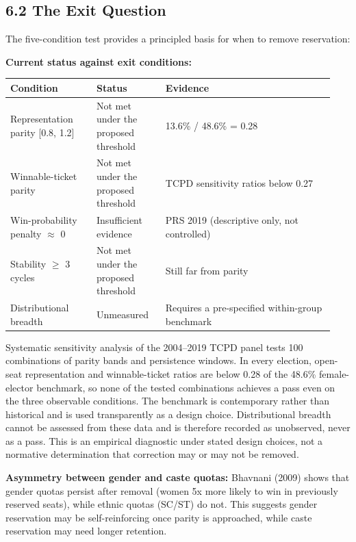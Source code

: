 \documentclass[
]{article}
\newcounter{none} %
\begin{document}
\subsection{6.2 The Exit Question}\label{62-the-exit-question}

The five-condition test provides a principled basis for when to remove reservation:

\textbf{Current status against exit conditions:}

{\def\LTcaptype{none} %
\begin{longtable}[]{@{}p{0.25\linewidth}p{0.20\linewidth}p{0.49\linewidth}@{}}
\toprule\noalign{}
Condition & Status & Evidence \\
\midrule\noalign{}
\endhead
\bottomrule\noalign{}
\endlastfoot
Representation parity {[}0.8, 1.2{]} & Not met under the proposed threshold & 13.6\% / 48.6\% = 0.28 \\
Winnable-ticket parity & Not met under the proposed threshold & TCPD sensitivity ratios below 0.27 \\
Win-probability penalty $\approx$ 0 & Insufficient evidence & PRS 2019 (descriptive only, not controlled) \\
Stability $\geq$ 3 cycles & Not met under the proposed threshold & Still far from parity \\
Distributional breadth & Unmeasured & Requires a pre-specified within-group benchmark \\
\end{longtable}
}

Systematic sensitivity analysis of the 2004--2019 TCPD panel tests 100 combinations of parity bands and persistence windows. In every election, open-seat representation and winnable-ticket ratios are below 0.28 of the 48.6\% female-elector benchmark, so none of the tested combinations achieves a pass even on the three observable conditions. The benchmark is contemporary rather than historical and is used transparently as a design choice. Distributional breadth cannot be assessed from these data and is therefore recorded as unobserved, never as a pass. This is an empirical diagnostic under stated design choices, not a normative determination that correction may or may not be removed.

\textbf{Asymmetry between gender and caste quotas:} Bhavnani (2009) shows that gender quotas persist after removal (women 5x more likely to win in previously reserved seats), while ethnic quotas (SC/ST) do not. This suggests gender reservation may be self-reinforcing once parity is approached, while caste reservation may need longer retention.
\end{document}
